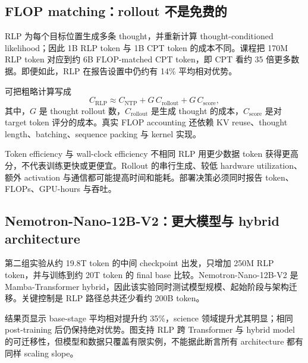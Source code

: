 \subsection{FLOP matching：rollout 不是免费的}

RLP 为每个目标位置生成多条 thought，并重新计算 thought-conditioned likelihood；因此 1B RLP token 与 1B CPT token 的成本不同。课程把 170M RLP token 对应到约 6B FLOP-matched CPT token，即 CPT 看约 35 倍更多数据。即便如此，RLP 在报告设置中仍约有 14\% 平均相对优势。


可把粗略计算写成
\[
C_{\mathrm{RLP}}
\approx C_{\mathrm{NTP}}+G\,C_{\mathrm{rollout}}+G\,C_{\mathrm{score}},
\]
其中，$G$ 是 thought rollout 数，$C_{\mathrm{rollout}}$ 是生成 thought 的成本，$C_{\mathrm{score}}$ 是对 target token 评分的成本。真实 FLOP accounting 还依赖 KV reuse、thought length、batching、sequence packing 与 kernel 实现。

\begin{warningbox}{Token efficiency 与 wall-clock efficiency 不相同}
RLP 用更少数据 token 获得更高分，不代表训练更快或更便宜。Rollout 的串行生成、较低 hardware utilization、额外 activation 与通信都可能提高时间和能耗。部署决策必须同时报告 token、FLOPs、GPU-hours 与吞吐。
\end{warningbox}

\subsection{Nemotron-Nano-12B-V2：更大模型与 hybrid architecture}

第二组实验从约 19.8T token 的中间 checkpoint 出发，只增加 250M RLP token，并与训练到约 20T token 的 final base 比较。Nemotron-Nano-12B-V2 是 Mamba-Transformer hybrid，因此该实验同时测试模型规模、起始阶段与架构迁移。关键控制是 RLP 路径总共还少看约 200B token。



结果页显示 base-stage 平均相对提升约 35\%，science 领域提升尤其明显；相同 post-training 后仍保持绝对优势。图支持 RLP 跨 Transformer 与 hybrid model 的可迁移性，但模型和数据只覆盖有限实例，不能据此断言所有 architecture 都有同样 scaling slope。

